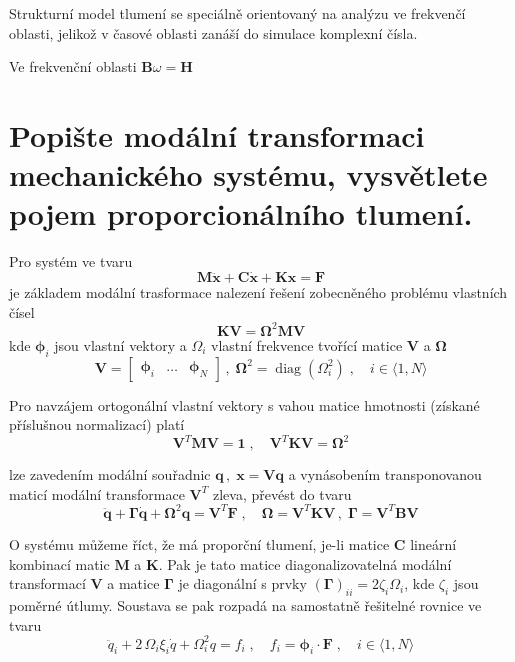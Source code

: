 \documentclass{article}
\begin{document}
	Strukturní model tlumení se speciálně orientovaný na analýzu ve frekvenčí oblasti, jelikož v časové oblasti zanáší do simulace komplexní čísla.

	Ve frekvenční oblasti $\bm{B}\omega = \bm{H}$

	\pagebreak
	\section{Popište modální transformaci mechanického systému, vysvětlete pojem proporcionálního tlumení. }

	Pro systém ve tvaru
	\begin{equation*}
		\bm{M}\bm{\ddot{x}} + \bm{C}\bm{\dot{x}} + \bm{K}\bm{x} = \bm{F}
	\end{equation*}
	je základem modální trasformace nalezení řešení zobecněného problému vlastních čísel
	\begin{equation*}
		\bm{K}\bm{V} = \bm{\Omega}^2 \bm{M} \bm{V}
	\end{equation*}
	kde $\bm{\phi}_i$ jsou vlastní vektory a $\Omega_i$ vlastní frekvence tvořící matice $\bm{V}$ a $\bm{\Omega}$  
	\begin{equation*}
		\bm{V} = \begin{bmatrix} \bm{\phi}_i & \dots & \bm{\phi}_N \end{bmatrix}
		\,,\;
		\bm{\Omega}^2 = \operatorname{diag}(\Omega_i^2)
		\;,\quad 
		i \in \langle 1,N \rangle
	\end{equation*}

	Pro navzájem ortogonální vlastní vektory s vahou matice hmotnosti (získané příslušnou normalizací) platí
	\begin{equation*}
		\bm{V}^T\bm{M}\bm{V} = \bm{1}
		\;,\quad 
		\bm{V}^T\bm{K}\bm{V} = \bm{\Omega}^2
	\end{equation*}
	
	lze zavedením modální souřadnic $\bm{q} \,,\; \bm{x} = \bm{V}\bm{q}$ a vynásobením transponovanou maticí modální transformace $\bm{V}^T$ zleva, převést do tvaru
	\begin{equation*}
		\bm{\ddot{q}} + \bm{\Gamma}\bm{\dot{q}} + \bm{\Omega}^2 \bm{q} = \bm{V}^T \bm{F}
		\;,\quad 
		\bm{\Omega} = \bm{V}^T\bm{K}\bm{V}
		\,,\;
		\bm{\Gamma} = \bm{V}^T\bm{B}\bm{V}
	\end{equation*}

	O systému můžeme říct, že má proporční tlumení, je-li matice $\bm{C}$ lineární kombinací matic $\bm{M}$ a $\bm{K}$. Pak je tato matice diagonalizovatelná modální transformací $\bm{V}$ a matice $\bm{\Gamma}$ je diagonální s prvky $(\bm{\Gamma})_{ii} = 2 \zeta_{i} \Omega_i$, kde $\zeta_i$ jsou poměrné útlumy. Soustava se pak rozpadá na samostatně řešitelné rovnice ve tvaru
	\begin{equation*}
		\ddot{q}_i + 2\,\Omega_i\xi_i \dot{q} + \Omega_i^2 q = f_i
		\;,\quad 
		f_i = \bm{\phi}_i \cdot \bm{F}
		\;,\quad 
		i \in \langle 1,N \rangle
	\end{equation*}
\end{document}
